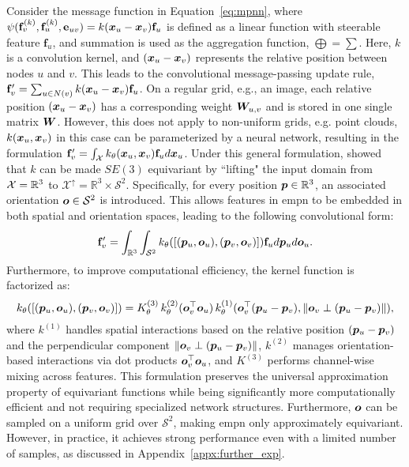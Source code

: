Consider the message function in Equation~\ref{eq:mpnn}, where $\psi(\mathbf{f}_v^{(k)}, \mathbf{f}_u^{(k)}, \mathbf{e}_{uv}) = k({\bm{x}}_u - {\bm{x}}_v) \mathbf{f}_u$ is defined as a linear function with steerable feature $\mathbf{f}_u$, and summation is used as the aggregation function, $\bigoplus = \sum$. Here, $k$ is a convolution kernel, and $({\bm{x}}_u - {\bm{x}}_v)$ represents the relative position between nodes $u$ and $v$. This leads to the convolutional message-passing update rule, $\mathbf{f}'_v = \sum_{u \in N(v)} k ({\bm{x}}_u - {\bm{x}}_v) \mathbf{f}_u$. 
On a regular grid, e.g., an image, each relative position $({\bm{x}}_u - {\bm{x}}_v)$ has a corresponding weight ${\bm{W}}_{u,v}$ and is stored in one single matrix ${\bm{W}}$. 
However, this does not apply to non-uniform grids, e.g. point clouds, $k({\bm{x}}_u, {\bm{x}}_v)$ in this case can be parameterized by a neural network, resulting in the formulation
$
\mathbf{f}'_v = \int_{\mathcal{X}} k_\theta({\bm{x}}_u, {\bm{x}}_v) \mathbf{f}_u d{{\bm{x}}_u}
$.
Under this general formulation, \citet{bekkers2024fast} showed that $k$ can be made $SE(3)$ equivariant by ``lifting" the input domain from ${\mathcal{X}} = \mathbb{R}^3$ to $\mathcal{X}^\uparrow = \mathbb{R}^3 \times \mathcal{S}^2$. Specifically, for every position ${\bm{p}} \in \mathbb{R}^3$, an associated orientation ${\bm{o}} \in \mathcal{S}^2$ is introduced. This allows features in \gls{empn} to be embedded in both spatial and orientation spaces, leading to the following convolutional form:
$$
\mathbf{f}'_v = \int_{\mathbb{R}^3} \int_{\mathcal{S}^2} k_\theta ([({\bm{p}}_u, {\bm{o}}_u), ({\bm{p}}_v, {\bm{o}}_v) ]) \mathbf{f}_u d{{\bm{p}}_u} d{{\bm{o}}_u}.
$$ 
Furthermore, to improve computational efficiency, the kernel function is factorized as:
$$
k_\theta ([({\bm{p}}_u, {\bm{o}}_u), ({\bm{p}}_v, {\bm{o}}_v) ]) = K_\theta^{(3)} \, k_\theta^{(2)}({\bm{o}}_v^\top {\bm{o}}_u) \, k_\theta^{(1)}({\bm{o}}_v^\top ({\bm{p}}_u - {\bm{p}}_v), \| {\bm{o}}_v \perp ({\bm{p}}_u - {\bm{p}}_v) \|),
$$
where $k^{(1)}$ handles spatial interactions based on the relative position $({\bm{p}}_u - {\bm{p}}_v)$ and the perpendicular component $\| {\bm{o}}_v \perp ({\bm{p}}_u - {\bm{p}}_v) \|$, $k^{(2)}$ manages orientation-based interactions via dot products ${\bm{o}}_v^\top {\bm{o}}_u$, and $K^{(3)}$ performs channel-wise mixing across features. 
This formulation preserves the universal approximation property of equivariant functions while being significantly more computationally efficient and not requiring specialized network structures. Furthermore, ${\bm{o}}$ can be sampled on a uniform grid over $\mathcal{S}^2$, making \gls{empn} only approximately equivariant. However, in practice, it achieves strong performance even with a limited number of samples, as discussed in Appendix~\ref{appx:further_exp}.

